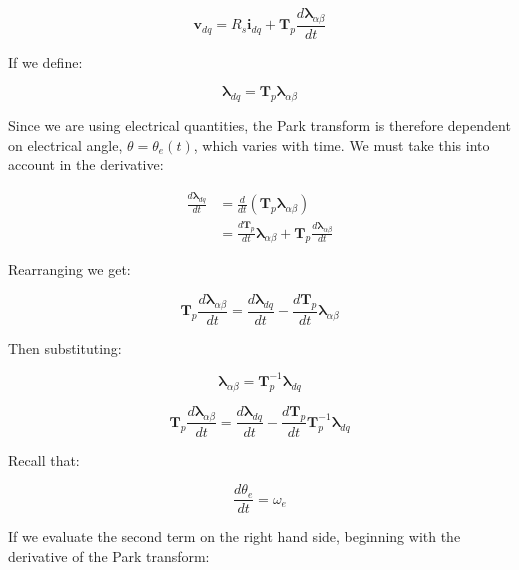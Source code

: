\documentclass{article}
\begin{document}
\begin{equation}
\label{eqn-dq-intermediate1}
    \mathbf{v}_{dq}
    =
    R_s\mathbf{i}_{dq}
    +
    \mathbf{T}_p\frac{d\boldsymbol{\lambda}_{\alpha\beta}}{dt}
\end{equation}

If we define:

\begin{equation}
\label{eqn-dq-ab-flux-park}
    \boldsymbol{\lambda}_{dq} = \mathbf{T}_p\boldsymbol{\lambda}_{\alpha\beta}
\end{equation}

Since we are using electrical quantities, the Park transform is therefore dependent on electrical angle, $\theta = \theta_e(t)$, which varies with time. We must take this into account in the derivative:

\begin{align}
    \frac{d\boldsymbol{\lambda}_{dq}}{dt} 
    &= \frac{d}{dt}(\mathbf{T}_p\boldsymbol{\lambda}_{\alpha\beta}) \\[6pt]
    &= \frac{d\mathbf{T}_p}{dt}\boldsymbol{\lambda}_{\alpha\beta} + \mathbf{T}_p\frac{d\boldsymbol{\lambda}_{\alpha\beta}}{dt}
\end{align}

Rearranging we get:

\begin{equation}
    \mathbf{T}_p\frac{d\boldsymbol{\lambda}_{\alpha\beta}}{dt} = \frac{d\boldsymbol{\lambda}_{dq}}{dt} - \frac{d\mathbf{T}_p}{dt}\boldsymbol{\lambda}_{\alpha\beta}
\end{equation}

Then substituting:

\begin{equation}
    \boldsymbol{\lambda}_{\alpha\beta} = \mathbf{T}_p^{-1}\boldsymbol{\lambda}_{dq}
\end{equation}

\begin{equation}
    \mathbf{T}_p\frac{d\boldsymbol{\lambda}_{\alpha\beta}}{dt} = \frac{d\boldsymbol{\lambda}_{dq}}{dt} - \frac{d\mathbf{T}_p}{dt}\mathbf{T}_p^{-1}\boldsymbol{\lambda}_{dq}
\end{equation}

Recall that:

\begin{equation}
    \frac{d\theta_e}{dt} = \omega_e
\end{equation}

If we evaluate the second term on the right hand side, beginning with the derivative of the Park transform:
\end{document}
